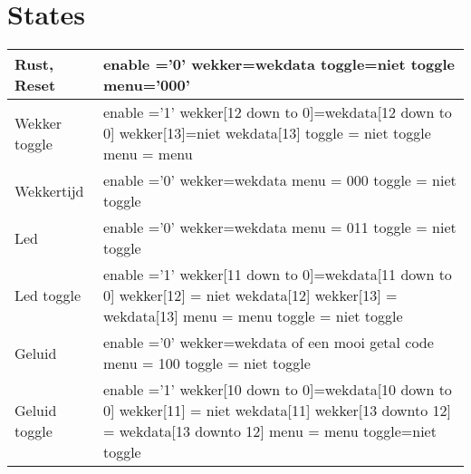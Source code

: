 \documentclass[a4paper, oneside, 10pt]{article}
\begin{document}
\section{States}
\begin{longtable}{|l| p{10cm} |}
\hline
Rust, Reset &
enable ='0' \newline
wekker=wekdata \newline
toggle=niet toggle \newline
menu='000' \\ \hline
Wekker toggle &
enable ='1' \newline
wekker[12 down to 0]=wekdata[12 down to 0] \newline
wekker[13]=niet wekdata[13] \newline
toggle = niet toggle \newline
menu = menu \\ \hline
Wekkertijd &
enable ='0' \newline
wekker=wekdata \newline
menu = 000 \newline
toggle = niet toggle \\ \hline
Led &
enable ='0' \newline
wekker=wekdata \newline
menu = 011 \newline
toggle = niet toggle \\ \hline
Led toggle &
enable ='1' \newline
wekker[11 down to 0]=wekdata[11 down to 0]\newline
wekker[12] = niet wekdata[12] \newline
wekker[13] = wekdata[13] \newline
menu = menu \newline
toggle = niet toggle \\ \hline
Geluid & 
enable ='0' \newline
wekker=wekdata of een mooi getal code \newline
menu = 100 \newline
toggle = niet toggle \\ \hline
Geluid toggle &
enable ='1' \newline
wekker[10 down to 0]=wekdata[10 down to 0] \newline
wekker[11] = niet wekdata[11] \newline
wekker[13 downto 12] = wekdata[13 downto 12] \newline
menu = menu \newline
toggle=niet toggle \\ \hline

\end{longtable}
\end{document}
